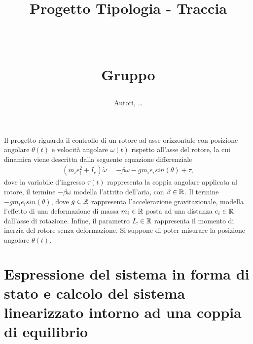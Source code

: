 \documentclass[a4paper, 11pt]{article}
\title{ \vspace{-1in}
		\huge \strut \coursename \strut 
		\\
		\Large  \strut Progetto Tipologia \tipology - Traccia \trace 
		\\
		\Large  \strut \projectname\strut
		\\
		\Large  \strut Gruppo \group\strut
		\vspace{-0.4cm}
}
\author{Autori, \dots}
\date{}
\begin{document}
\maketitle
\vspace{-0.5cm}

Il progetto riguarda il controllo di un rotore ad asse orizzontale con posizione angolare $ \theta (t)$ e velocità angolare $\omega (t)$ rispetto
all’asse del rotore, la cui dinamica viene descritta dalla seguente equazione differenziale 
%
\begin{subequations}\label{eq:system}
\begin{align}
	(m_i e_i^2+I_e) \dot \omega = - \beta \omega - g m_i e_i sin(\theta) + \tau,
\end{align}
\end{subequations}
%
dove la variabile d'ingresso $\tau (t)$ rappresenta la coppia angolare applicata al rotore, il termine $-\beta \omega$ modella l'attrito dell'aria, con $\beta \in \Bbb R$. Il termine $- g m_i e_i sin(\theta)$, dove $g \in \Bbb R$ rappresenta l'accelerazione gravitazionale, modella l'effetto di una deformazione di massa $m_i \in 
\Bbb R $ posta ad una distanza $e_i \in \Bbb R $ dall'asse di rotazione. Infine, il parametro $I_e \in \Bbb R$ rappresenta il momento di inerzia del rotore senza deformazione. Si suppone di poter misurare la posizione angolare $\theta (t)$.


\section{Espressione del sistema in forma di stato e calcolo del sistema linearizzato intorno ad una coppia di equilibrio}
\end{document}
